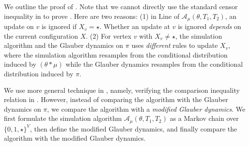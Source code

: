 \documentclass[11pt,a4paper]{article}
\theoremstyle{definition}
\def\+#1{\mathcal{#1}} %
\begin{document}
We outline the proof of . Note that we cannot directly use the standard censor inequality in \cite{peres2013can} to prove .  Here are two reasons: (1) in Line  of $\+A_{\mu}(\theta,T_1,T_2)$, an update on $v$ is ignored if $X_v = \star$. Whether an update at $v$ is ignored \emph{depends} on the current configuration $X$. (2) For vertex $v$ with $X_v \neq \star$, the simulation algorithm and the Glauber dynamics on $\pi$ uses \emph{different} rules to update $X_v$, where the simulation algorithm resamples from the conditional distribution induced by $(\theta * \mu)$ while the Glauber dynamics  resamples from the conditional distribution induced by $\pi$.



We use more general technique in \cite{FillK13}, namely, verifying the comparison inequality relation in .
However, instead of comparing the algorithm with the Glauber dynamics on $\pi$, we compare the algorithm with a \emph{modified Glauber dynamics}. 
We first formulate the simulation algorithm $\+A_{\mu}(\theta,T_1,T_2)$ as a Markov chain over $\{0,1,\star\}^V$, then define the modified Glauber dynamics, and finally compare the algorithm with the modified Glauber dynamics.
\end{document}
